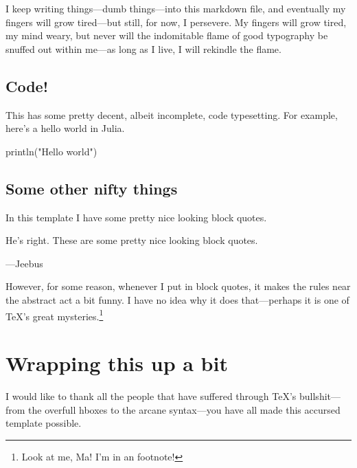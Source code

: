 \documentclass[%
	english,%
	 a4paper,%
	titlepage,%
	fleqn]{article}
\newenvironment{Shaded}{}{}
\newcommand{\FunctionTok}[1]{\textcolor[rgb]{0.02,0.16,0.49}{#1}}
\newcommand{\NormalTok}[1]{#1}
\newcommand{\StringTok}[1]{\textcolor[rgb]{0.25,0.44,0.63}{#1}}
\renewenvironment{quote}{\begin{customblockquote}\vspace{-0.5cm}{\rightmargin=0em\leftmargin=0em}%
\item\relax\color{blockquote-text}\ignorespaces}{\unskip\unskip\end{customblockquote}}
\begin{document}
I keep writing things---dumb things---into this markdown file, and
eventually my fingers will grow tired---but still, for now, I persevere.
My fingers will grow tired, my mind weary, but never will the
indomitable flame of good typography be snuffed out within me---as long
as I live, I will rekindle the flame.

\hypertarget{code}{%
\subsection{Code!}\label{code}}

This has some pretty decent, albeit incomplete, code typesetting. For
example, here's a hello world in Julia.

\begin{Shaded}
\begin{Highlighting}[]
\FunctionTok{println}\NormalTok{(}\StringTok{"Hello world"}\NormalTok{)}
\end{Highlighting}
\end{Shaded}

\hypertarget{some-other-nifty-things}{%
\subsection{Some other nifty things}\label{some-other-nifty-things}}

In this template I have some pretty nice looking block quotes.

\begin{quote}
He's right. These are some pretty nice looking block quotes.

---Jeebus
\end{quote}

However, for some reason, whenever I put in block quotes, it makes the
rules near the abstract act a bit funny. I have no idea why it does
that---perhaps it is one of {\TeX}'s great mysteries.\footnote{Look at
  me, Ma! I'm in an footnote!}

\hypertarget{wrapping-this-up-a-bit}{%
\section{Wrapping this up a bit}\label{wrapping-this-up-a-bit}}

\lipsum[1]

I would like to thank all the people that have suffered through {\TeX}'s
bullshit---from the overfull hboxes to the arcane syntax---you have all
made this accursed template possible.
\end{document}
